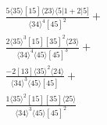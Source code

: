 \documentclass[varwidth, border=5pt]{standalone}
\begin{document}
\begin{my}
$\begin{gathered}
\scriptscriptstyle\frac{5⟨35⟩[15]⟨23⟩⟨5|1+2|5]}{⟨34⟩^4[45]^2}+\\
\scriptscriptstyle\frac{2⟨35⟩^3[15][35]^2⟨23⟩}{⟨34⟩^4⟨45⟩[45]^3}+\\
\scriptscriptstyle\frac{-2[13]⟨35⟩^2⟨24⟩}{⟨34⟩^3⟨45⟩[45]}+\\
\scriptscriptstyle\frac{1⟨35⟩^2[15][35]⟨25⟩}{⟨34⟩^3⟨45⟩[45]^2}\phantom{+}
\end{gathered}$
\end{my}
\end{document}
